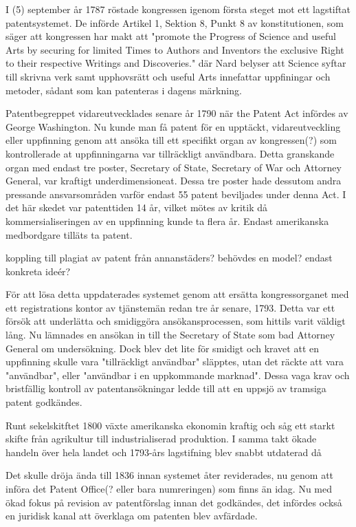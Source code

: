 I (5) september år 1787 röstade kongressen igenom första steget mot ett lagstiftat patentsystemet. De
införde Artikel 1, Sektion 8, Punkt 8 av konstitutionen, som säger att kongressen har makt att "promote
the Progress of Science and useful Arts by securing for limited Times to Authors and Inventors the
exclusive Right to their respective Writings and Discoveries." där Nard belyser att Science syftar till skrivna verk samt
upphovsrätt och useful Arts innefattar uppfiningar och metoder, sådant som kan patenteras i dagens märkning\cite{nard}.

Patentbegreppet vidareutvecklades senare år 1790 när the Patent Act infördes av George Washington. Nu kunde
man få patent för en upptäckt, vidareutveckling eller uppfinning genom att ansöka till ett specifikt organ
av kongressen(?) som kontrollerade at uppfinningarna var tillräckligt användbara\cite{nard}. Detta granskande organ med endast tre poster, Secretary of State, Secretary of War och Attorney
General, var kraftigt underdimensioneat. Dessa tre poster hade dessutom andra pressande ansvarsområden varför endast
55 patent beviljades under denna Act\cite{nard}. I det här skedet var patenttiden 14 år, vilket mötes av kritik då
kommersialiseringen av en uppfinning kunde ta flera år. Endast amerikanska medbordgare tilläts ta patent\cite{nard}.

koppling till plagiat av patent från annanstäders?
behövdes en model? endast konkreta ideér?

För att lösa detta uppdaterades systemet genom att ersätta kongressorganet med ett registrations kontor av
tjänstemän redan tre år senare, 1793. Detta var ett försök att underlätta och smidiggöra ansökansprocessen, som
hittils varit väldigt lång. Nu lämnades en ansökan in till the Secretary of State som bad Attorney General
om undersökning. Dock blev det lite för smidigt och kravet att en uppfinning skulle vara "tillräckligt
användbar" släpptes, utan det räckte att vara "användbar", eller "användbar i en uppkommande marknad".
Dessa vaga krav och bristfällig kontroll av patentansökningar ledde till att en uppsjö av tramsiga patent
godkändes\cite{nard}.

Runt sekelskitftet 1800 växte amerikanska ekonomin kraftig och såg ett starkt skifte från agrikultur till
industrialiserad produktion. I samma takt ökade handeln över hela landet och 1793-års lagstifning blev
snabbt utdaterad då

 Det skulle dröja ända till 1836 innan systemet åter reviderades, nu genom att införa det Patent Office(?
eller bara numreringen) som finns än idag. Nu med ökad fokus på revision av patentförslag innan det
godkändes, det infördes också en juridisk kanal att överklaga om patenten blev avfärdade.

